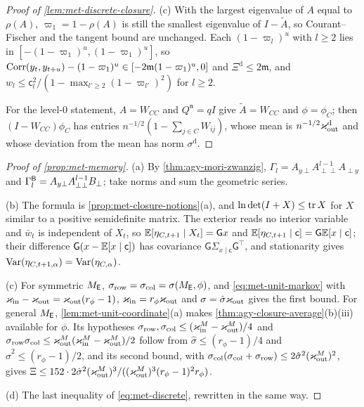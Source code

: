 \begin{proof}[Proof of \cref{lem:met-discrete-closure}]
(c) With the largest eigenvalue of $A$ equal to $\rho(A)$, $\varpi_1=1-\rho(A)$ is still the smallest eigenvalue of $I-\tilde A$, so Courant--Fischer and the tangent bound are unchanged. Each $(1-\varpi_l)^u$ with $l\ge2$ lies in $[-(1-\varpi_1)^u,(1-\varpi_1)^u]$, so $\operatorname{Corr}(y_t,y_{t+u})-(1-\varpi_1)^u\in[-2\mathfrak m(1-\varpi_1)^u,0]$ and $\Xi^{\mathrm d}\le2\mathfrak m$, and $w_l\le\mathsf c_l^2/(1-\max_{l'\ge2}(1-\varpi_{l'})^2)$ for $l\ge2$.

For the level-0 statement, $A=W_{CC}$ and $Q^{\mathfrak n}=qI$ give $\tilde A=W_{CC}$ and $\phi=\phi_C$; then $(I-W_{CC})\phi_C$ has entries $n^{-1/2}(1-\sum_{j\in C}W_{ij})$, whose mean is $n^{-1/2}\varkappa_{\mathrm{out}}^{\mathrm d}$ and whose deviation from the mean has norm $\sigma^{\mathrm d}$.
\end{proof}

\begin{proof}[Proof of \cref{prop:met-memory}]
(a) By \cref{thm:agy-mori-zwanzig}, $\Gamma_l=A_{y\perp}A_{\perp\perp}^{l-1}A_{\perp y}$ and $\Gamma^{\mathsf{B}}_l=A_{y\perp}A_{\perp\perp}^{l-1}B_\perp$; take norms and sum the geometric series.

(b) The formula is \cref{prop:met-closure-notions}(a), and $\ln\det(I+X)\le\operatorname{tr} X$ for $X$ similar to a positive semidefinite matrix. The exterior reads no interior variable and $\bar w_t$ is independent of $X_t$, so $\mathbb{E}[\eta_{C,t+1}\mid X_t]=\mathsf Gx$ and $\mathbb{E}[\eta_{C,t+1}\mid\mathsf c]=\mathsf G\mathbb{E}[x\mid\mathsf c]$; their difference $\mathsf G(x-\mathbb{E}[x\mid\mathsf c])$ has covariance $\mathsf G\Sigma_{x\mid\mathsf c}\mathsf G^\top$, and stationarity gives $\operatorname{Var}(\eta_{C,t+1,\alpha})=\operatorname{Var}(\eta_{C,\alpha})$.

(c) For symmetric $M_{\mathsf{E}}$, $\sigma_{\mathrm{row}}=\sigma_{\mathrm{col}}=\sigma(M_{\mathsf{E}},\phi)$, and \eqref{eq:met-unit-markov} with $\varkappa_{\mathrm{in}}-\varkappa_{\mathrm{out}}=\varkappa_{\mathrm{out}}(r_\phi-1)$, $\varkappa_{\mathrm{in}}=r_\phi\varkappa_{\mathrm{out}}$ and $\sigma=\hat\sigma\varkappa_{\mathrm{out}}$ gives the first bound. For general $M_{\mathsf{E}}$, \cref{lem:met-unit-coordinate}(a) makes \cref{thm:agy-closure-average}(b)(iii) available for $\phi$. Its hypotheses $\sigma_{\mathrm{row}},\sigma_{\mathrm{col}}\le(\varkappa_{\mathrm{in}}^M-\varkappa_{\mathrm{out}}^M)/4$ and $\sigma_{\mathrm{row}}\sigma_{\mathrm{col}}\le\varkappa_{\mathrm{out}}^M(\varkappa_{\mathrm{in}}^M-\varkappa_{\mathrm{out}}^M)/2$ follow from $\hat\sigma\le(r_\phi-1)/4$ and $\hat\sigma^2\le(r_\phi-1)/2$, and its second bound, with $\sigma_{\mathrm{col}}(\sigma_{\mathrm{col}}+\sigma_{\mathrm{row}})\le2\hat\sigma^2(\varkappa_{\mathrm{out}}^M)^2$, gives $\Xi\le152\cdot2\hat\sigma^2(\varkappa_{\mathrm{out}}^M)^3/((\varkappa_{\mathrm{out}}^M)^3(r_\phi-1)^2r_\phi)$.

(d) The last inequality of \eqref{eq:met-discrete}, rewritten in the same way.
\end{proof}

